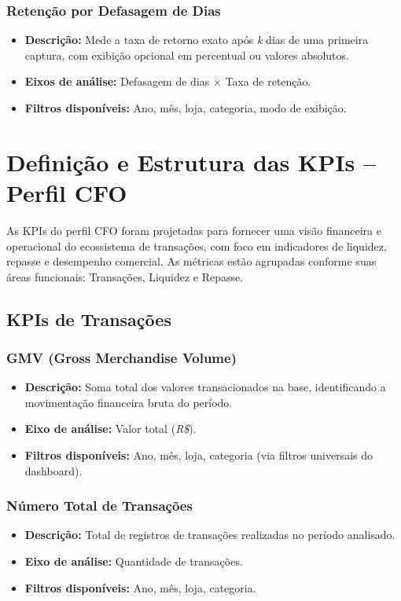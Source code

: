 \documentclass[12pt]{article}
\begin{document}
\subsubsection{Retenção por Defasagem de Dias}
\begin{itemize}
    \item \textbf{Descrição:} Mede a taxa de retorno exato após \textit{k} dias de uma primeira captura, com exibição opcional em percentual ou valores absolutos.
    \item \textbf{Eixos de análise:} Defasagem de dias × Taxa de retenção.
    \item \textbf{Filtros disponíveis:} Ano, mês, loja, categoria, modo de exibição.
\end{itemize}

\section{Definição e Estrutura das KPIs – Perfil CFO}

As KPIs do perfil CFO foram projetadas para fornecer uma visão financeira e operacional do ecossistema de transações, com foco em indicadores de liquidez, repasse e desempenho comercial. 
As métricas estão agrupadas conforme suas áreas funcionais: Transações, Liquidez e Repasse.

\subsection{KPIs de Transações}

\subsubsection{GMV (Gross Merchandise Volume)}
\begin{itemize}
    \item \textbf{Descrição:} Soma total dos valores transacionados na base, identificando a movimentação financeira bruta do período.
    \item \textbf{Eixo de análise:} Valor total (\textit{R\$}).
    \item \textbf{Filtros disponíveis:} Ano, mês, loja, categoria (via filtros universais do dashboard).
\end{itemize}

\subsubsection{Número Total de Transações}
\begin{itemize}
    \item \textbf{Descrição:} Total de registros de transações realizadas no período analisado.
    \item \textbf{Eixo de análise:} Quantidade de transações.
    \item \textbf{Filtros disponíveis:} Ano, mês, loja, categoria.
\end{itemize}
\end{document}
